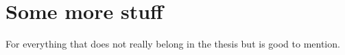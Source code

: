 \chapter{Some more stuff}

For everything that does not really belong in the thesis but is good to mention.
